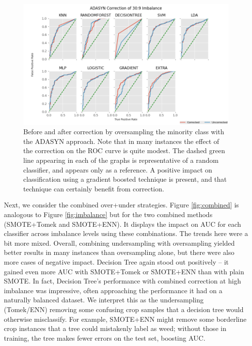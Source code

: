\documentclass[agriengineering,article,submit,pdftex,moreauthors]{Definitions/mdpi}
\begin{document}
\begin{figure}[h]
	\centering
	\includegraphics[height=0.25\textheight]{figures/roc-corrected.png}
	\caption[Before and after correction]{Before and after correction by oversampling the minority class with the ADASYN approach. Note that in many instances the effect of the correction on the ROC curve is quite modest. The dashed green line appearing in each of the graphs is representative of a random classifier, and appears only as a reference. A positive impact on classification using a gradient boosted technique is present, and that technique can certainly benefit from correction. }
	\label{fig:auc}
\end{figure}

Next, we consider the combined over+under strategies. Figure \ref{fig:combined} is analogous to Figure \ref{fig:imbalance} but for the two combined methods (SMOTE+Tomek and SMOTE+ENN). It displays the impact on AUC for each classifier across imbalance levels using these combinations. The trends here were a bit more mixed. Overall, combining undersampling with oversampling yielded better results in many instances than oversampling alone, but there were also more cases of negative impact. Decision Tree again stood out positively – it gained even more AUC with SMOTE+Tomek or SMOTE+ENN than with plain SMOTE. In fact, Decision Tree’s performance with combined correction at high imbalance was impressive, often approaching the performance it had on a naturally balanced dataset. We interpret this as the undersampling (Tomek/ENN) removing some confusing crop samples that a decision tree would otherwise misclassify. For example, SMOTE+ENN might remove some borderline crop instances that a tree could mistakenly label as weed; without those in training, the tree makes fewer errors on the test set, boosting AUC.
\end{document}
